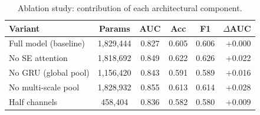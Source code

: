 \begin{table}[h]
\centering
\caption{Ablation study: contribution of each architectural component.}
\label{tab:ablation}
\begin{tabular}{lccccr}
\toprule
Variant & Params & AUC & Acc & F1 & $\Delta$AUC \\
\midrule
Full model (baseline) & 1,829,444 & 0.827 & 0.605 & 0.606 & +0.000 \\
No SE attention & 1,818,692 & 0.849 & 0.622 & 0.626 & +0.022 \\
No GRU (global pool) & 1,156,420 & 0.843 & 0.591 & 0.589 & +0.016 \\
No multi-scale pool & 1,828,932 & 0.855 & 0.613 & 0.614 & +0.028 \\
Half channels & 458,404 & 0.836 & 0.582 & 0.580 & +0.009 \\
\bottomrule
\end{tabular}
\end{table}
